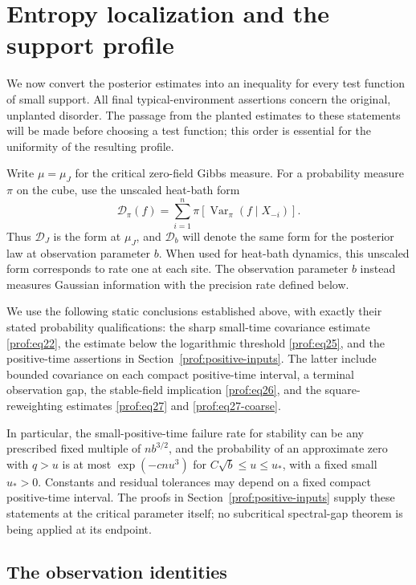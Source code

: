 \section{Entropy localization and the support profile}
\label{prof:entropy}

We now convert the posterior estimates into an inequality for every test
function of small support.  All final typical-environment assertions concern
the original, unplanted disorder.  The passage from the planted estimates to
these statements will be made before choosing a test function; this order is
essential for the uniformity of the resulting profile.

Write $\mu=\mu_J$ for the critical zero-field Gibbs measure.  For a probability
measure $\pi$ on the cube, use the unscaled heat-bath form
\[
 \mathcal D_\pi(f)
 =\sum_{i=1}^n\pi\!\left[\operatorname{Var}_\pi
                  (f\mid X_{-i})\right].
\]
Thus $\mathcal D_J$ is the form at $\mu_J$, and $\mathcal D_b$ will denote the
same form for the posterior law at observation parameter $b$.
When used for heat-bath dynamics, this unscaled form corresponds
to rate one at each site. The observation parameter \(b\) instead
measures Gaussian information with the precision rate defined below.

We use the following static conclusions established above, with exactly their
stated probability qualifications: the sharp small-time covariance estimate
\eqref{prof:eq22}, the estimate below the logarithmic threshold
\eqref{prof:eq25}, and the positive-time assertions in
Section~\ref{prof:positive-inputs}.  The latter include bounded covariance on
each compact positive-time interval, a terminal observation gap, the
stable-field implication \eqref{prof:eq26}, and the square-reweighting
estimates \eqref{prof:eq27} and \eqref{prof:eq27-coarse}.

In particular, the small-positive-time failure
rate for stability can be any prescribed fixed multiple of $n b^{3/2}$, and
the probability of an approximate zero with $q>u$ is at most
$\exp(-cnu^3)$ for \(C\sqrt b\le u\le u_*\), with a fixed
small \(u_*>0\). Constants and residual tolerances may
depend on a fixed compact positive-time interval.  The proofs in
Section~\ref{prof:positive-inputs} supply these statements at the critical
parameter itself; no subcritical spectral-gap theorem is being applied at
its endpoint.

\subsection{The observation identities}


